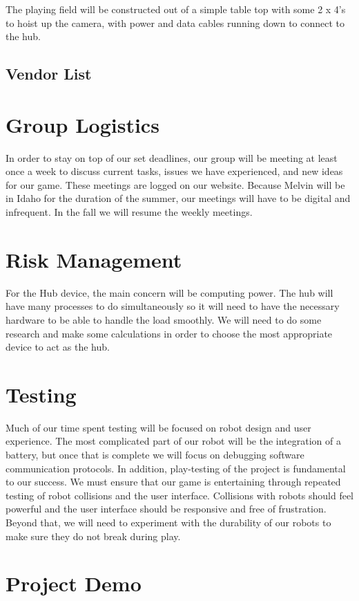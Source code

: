 \documentclass[11pt]{ieeeconf}
\begin{document}
The playing field will be constructed out of a simple table top with some 2 x 4's to hoist up the camera, with power and data cables running down to connect to the hub.

\subsection{Vendor List}

\section{Group Logistics}
In order to stay on top of our set deadlines, our group will be meeting at least once a week to discuss current tasks, issues we have experienced, and new ideas for our game. These meetings are logged on our website. Because Melvin will be in Idaho for the duration of the summer, our meetings will have to be digital and infrequent. In the fall we will resume the weekly meetings.

\section{Risk Management}
For the Hub device, the main concern will be computing power. The hub will have many processes to do simultaneously so it will need to have the necessary hardware to be able to handle the load smoothly. We will need to do some research and make some calculations in order to choose the most appropriate device to act as the hub.

\section{Testing}
Much of our time spent testing will be focused on robot design and user experience. The most complicated part of our robot will be the integration of a battery, but once that is complete we will focus on debugging software communication protocols. In addition, play-testing of the project is fundamental to our success. We must ensure that our game is entertaining through repeated testing of robot collisions and the user interface. Collisions with robots should feel powerful and the user interface should be responsive and free of frustration. Beyond that, we will need to experiment with the durability of our robots to make sure they do not break during play.

\section{Project Demo}
\end{document}
